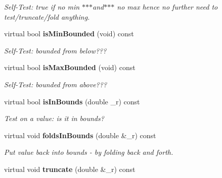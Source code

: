 \begin{CompactItemize}
\begin{CompactList}\small\item\em Self-Test: true if no min $\ast$$\ast$$\ast$and$\ast$$\ast$$\ast$ no max hence no further need to test/truncate/fold anything. \item\end{CompactList}\item 
virtual bool {\bf is\-Min\-Bounded} (void) const \label{classeo_real_above_bound_a8}

\begin{CompactList}\small\item\em Self-Test: bounded from below??? \item\end{CompactList}\item 
virtual bool {\bf is\-Max\-Bounded} (void) const \label{classeo_real_above_bound_a9}

\begin{CompactList}\small\item\em Self-Test: bounded from above??? \item\end{CompactList}\item 
virtual bool {\bf is\-In\-Bounds} (double \_\-r) const \label{classeo_real_above_bound_a10}

\begin{CompactList}\small\item\em Test on a value: is it in bounds? \item\end{CompactList}\item 
virtual void {\bf folds\-In\-Bounds} (double \&\_\-r) const \label{classeo_real_above_bound_a11}

\begin{CompactList}\small\item\em Put value back into bounds - by folding back and forth. \item\end{CompactList}\item 
virtual void {\bf truncate} (double \&\_\-r) const \label{classeo_real_above_bound_a12}


\end{CompactItemize}

